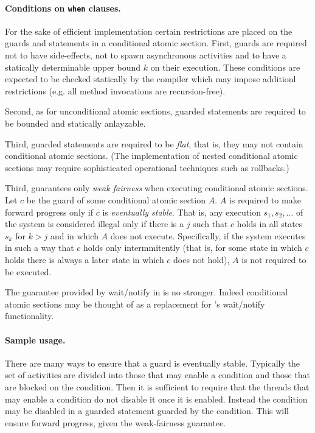 {{\paragraph{Conditions on {\tt when} clauses.} 

For the sake of efficient implementation certain restrictions are
placed on the guards and statements in a conditional atomic
section. First, guards are required not to have side-effects, not to
spawn asynchronous activities and to have a statically determinable
upper bound $k$ on their execution. These conditions are expected to
be checked statically by the compiler which may impose additionl
restrictions (e.g.{} all method invocations are recursion-free).

Second, as for unconditional atomic sections, guarded statements are
required to be bounded and statically anlayzable.

Third, guarded statements are required to be {\em flat}, that is, they
may not contain conditional atomic sections. (The implementation of
nested conditional atomic sections may require sophisticated
operational techniques such as rollbacks.)

Third, \Xten{} guarantees only {\em weak fairness} when executing
conditional atomic sections. Let $c$ be the guard of some conditional
atomic section $A$. $A$ is required to make forward progress only if
$c$ is {\em eventually stable}. That is, any execution $s_1, s_2,
\ldots$ of the system is considered illegal only if there is a $j$
such that $c$ holds in all states $s_k$ for $k > j$ and in which $A$
does not execute. Specifically, if the system executes in such a way
that $c$ holds only intermmitently (that is, for some state in which
$c$ holds there is always a later state in which $c$ does not hold),
$A$ is not required to be executed.

\begin{rationale}
The guarantee provided by {\cf wait/notify} in \java{} is no
stronger. Indeed conditional atomic sections may be thought of as a
replacement for \java's wait/notify functionality.
\end{rationale} 

\paragraph{Sample usage.} 
There are many ways to ensure that a guard is eventually
stable. Typically the set of activities are divided into those that
may enable a condition and those that are blocked on the
condition. Then it is sufficient to require that the threads that may
enable a condition do not disable it once it is enabled. Instead the
condition may be disabled in a guarded statement guarded by the
condition. This will ensure forward progress, given the weak-fairness
guarantee.

}}
